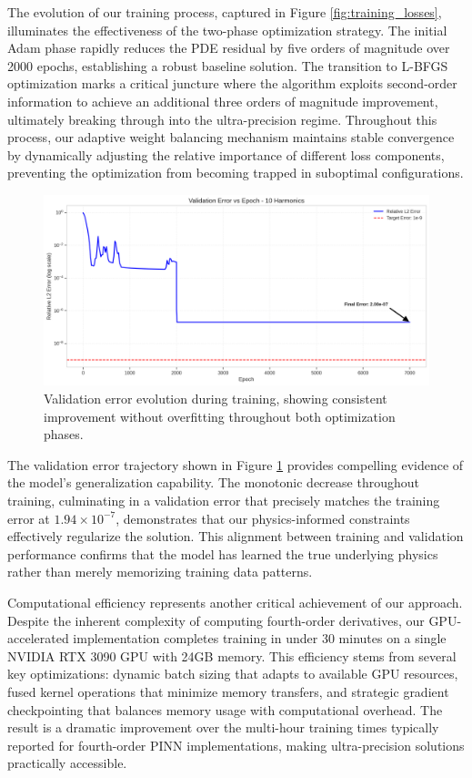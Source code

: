 The evolution of our training process, captured in Figure \ref{fig:training_losses}, illuminates the effectiveness of the two-phase optimization strategy. The initial Adam phase rapidly reduces the PDE residual by five orders of magnitude over 2000 epochs, establishing a robust baseline solution. The transition to L-BFGS optimization marks a critical juncture where the algorithm exploits second-order information to achieve an additional three orders of magnitude improvement, ultimately breaking through into the ultra-precision regime. Throughout this process, our adaptive weight balancing mechanism maintains stable convergence by dynamically adjusting the relative importance of different loss components, preventing the optimization from becoming trapped in suboptimal configurations.

\begin{figure}[ht]
    \centering
    \includegraphics[width = 1.0\linewidth]{figures/validation_error_10h.png}
    \caption{Validation error evolution during training, showing consistent improvement without overfitting throughout both optimization phases.}
    \label{fig:validation_error}
\end{figure}

The validation error trajectory shown in Figure \ref{fig:validation_error} provides compelling evidence of the model's generalization capability. The monotonic decrease throughout training, culminating in a validation error that precisely matches the training error at $1.94 \times 10^{-7}$, demonstrates that our physics-informed constraints effectively regularize the solution. This alignment between training and validation performance confirms that the model has learned the true underlying physics rather than merely memorizing training data patterns.

Computational efficiency represents another critical achievement of our approach. Despite the inherent complexity of computing fourth-order derivatives, our GPU-accelerated implementation completes training in under 30 minutes on a single NVIDIA RTX 3090 GPU with 24GB memory. This efficiency stems from several key optimizations: dynamic batch sizing that adapts to available GPU resources, fused kernel operations that minimize memory transfers, and strategic gradient checkpointing that balances memory usage with computational overhead. The result is a dramatic improvement over the multi-hour training times typically reported for fourth-order PINN implementations, making ultra-precision solutions practically accessible.

